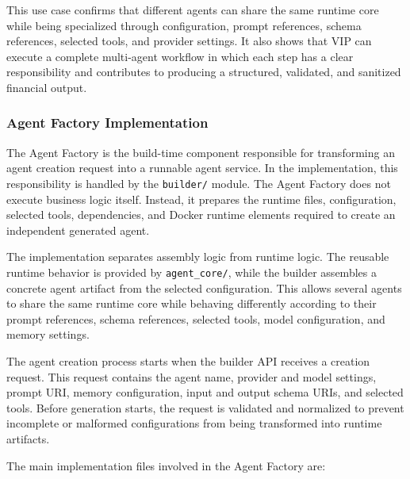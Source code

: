 This use case confirms that different agents can share the same runtime core while being specialized through configuration, prompt references, schema references, selected tools, and provider settings. It also shows that VIP can execute a complete multi-agent workflow in which each step has a clear responsibility and contributes to producing a structured, validated, and sanitized financial output.
   

\subsubsection{Agent Factory Implementation}

\label{sec:agent-factory-implementation}

The Agent Factory is the build-time component responsible for transforming an agent creation request into a runnable agent service. In the implementation, this responsibility is handled by the \texttt{builder/} module. The Agent Factory does not execute business logic itself. Instead, it prepares the runtime files, configuration, selected tools, dependencies, and Docker runtime elements required to create an independent generated agent.

The implementation separates assembly logic from runtime logic. The reusable runtime behavior is provided by \texttt{agent\_core/}, while the builder assembles a concrete agent artifact from the selected configuration. This allows several agents to share the same runtime core while behaving differently according to their prompt references, schema references, selected tools, model configuration, and memory settings.

The agent creation process starts when the builder API receives a creation request. This request contains the agent name, provider and model settings, prompt URI, memory configuration, input and output schema URIs, and selected tools. Before generation starts, the request is validated and normalized to prevent incomplete or malformed configurations from being transformed into runtime artifacts.

The main implementation files involved in the Agent Factory are:

